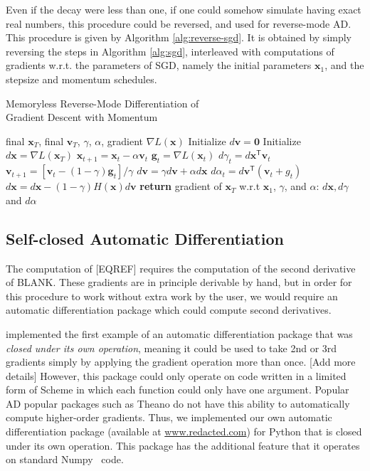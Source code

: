 \documentclass{article}
\newcommand{\vx}{\mathbf{x}}
\newcommand{\vv}{\mathbf{v}}
\newcommand{\vg}{\mathbf{g}}
\newcommand{\vzero}{\mathbf{0}}
\newcommand{\tra}{^{\mathsf{T}}}
\newcommand{\decay}{\gamma}
\newcommand{\stepsize}{\alpha}
\begin{document}
Even if the decay were less than one, if one could somehow simulate having exact real numbers, this procedure could be reversed, and used for reverse-mode AD.
This procedure is given by Algorithm \ref{alg:reverse-sgd}.
It is obtained by simply reversing the steps in Algorithm \ref{alg:sgd}, interleaved with computations of gradients w.r.t. the parameters of SGD, namely the initial parameters $\vx_1$, and the stepsize and momentum schedules.
%
\begin{algorithm}
   \caption{Memoryless Reverse-Mode Differentiation of \\Gradient Descent with Momentum}
   \label{alg:reverse-sgd}
\begin{algorithmic}[1]
    final $\vx_T$, final $\vv_T$, $\decay$, $\stepsize$, gradient $\nabla L(\vx)$
   \State Initialize $d\vv = \vzero$
   \State Initialize $d\vx = \nabla L(\vx_T)$
    \State $\vx_{t+1} = \vx_t - \stepsize \vv_t$  
   \State $\vg_t = \nabla L(\vx_t)$ 
   \State $d\decay_t = d\vx\tra \vv_t$
   \State $\vv_{t+1} = [\vv_t - (1 - \decay) \vg_t] / \decay$ 
   \State $d\vv = \decay d\vv + \stepsize d\vx$
   \State $d\stepsize_t = d\vv\tra(\vv_t + g_t)$
   \State $d\vx = d\vx - (1 - \decay) H(\vx) d\vv$
   \EndFor
   \State \textbf{return} gradient of $\vx_T$ w.r.t $\vx_1$, $\decay$, and $\stepsize$: $d\vx, d\decay$ and $d\stepsize$
\end{algorithmic}
\end{algorithm}
%

\subsection{Self-closed Automatic Differentiation}

The computation of [EQREF] requires the computation of the second derivative of BLANK.
These gradients are in principle derivable by hand, but in order for this procedure to work without extra work by the user, we would require an automatic differentiation package which could compute second derivatives.

\citet{pearlmutter2008reverse} implemented the first example of an automatic differentiation package that was \emph{closed under its own operation}, meaning it could be used to take 2nd or 3rd gradients simply by applying the gradient operation more than once. [Add more details]
However, this package could only operate on code written in a limited form of Scheme in which each function could only have one argument.
Popular AD popular packages such as Theano do not have this ability to automatically compute higher-order gradients.
Thus, we implemented our own automatic differentiation package (available at \url{www.redacted.com}) for Python that is closed under its own operation.
This package has the additional feature that it operates on standard Numpy~\cite{oliphant2007python} code.
\end{document}

